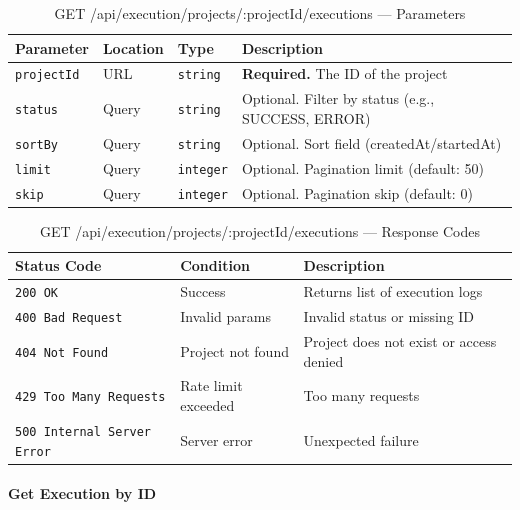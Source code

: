 \begin{table}[H]
\centering
\renewcommand{\arraystretch}{1.3}
\begin{tabularx}{\textwidth}{|l|l|l|X|}
\hline
\textbf{Parameter} & \textbf{Location} & \textbf{Type} & \textbf{Description} \\
\hline
\texttt{projectId} & URL   & \texttt{string}  & \textbf{Required.} The ID of the project \\
\hline
\texttt{status}    & Query & \texttt{string}  & Optional. Filter by status (e.g., SUCCESS, ERROR) \\
\hline
\texttt{sortBy}    & Query & \texttt{string}  & Optional. Sort field (createdAt/startedAt) \\
\hline
\texttt{limit}     & Query & \texttt{integer} & Optional. Pagination limit (default: 50) \\
\hline
\texttt{skip}      & Query & \texttt{integer} & Optional. Pagination skip (default: 0) \\
\hline
\end{tabularx}
\caption{GET /api/execution/projects/:projectId/executions — Parameters}
\label{tab:get-all-project-executions-params}
\end{table}

\begin{table}[H]
\centering
\renewcommand{\arraystretch}{1.3}
\begin{tabularx}{\textwidth}{|l|l|X|}
\hline
\textbf{Status Code} & \textbf{Condition} & \textbf{Description} \\
\hline
\texttt{200 OK}           & Success          & Returns list of execution logs \\
\hline
\texttt{400 Bad Request}  & Invalid params   & Invalid status or missing ID \\
\hline
\texttt{404 Not Found}    & Project not found & Project does not exist or access denied \\
\hline
\texttt{429 Too Many Requests} & Rate limit exceeded & Too many requests \\
\hline
\texttt{500 Internal Server Error} & Server error & Unexpected failure \\
\hline
\end{tabularx}
\caption{GET /api/execution/projects/:projectId/executions — Response Codes}
\label{tab:get-all-project-executions-responses}
\end{table}
\FloatBarrier

\paragraph{Get Execution by ID}
\label{subsubsec:get-execution-by-id}

